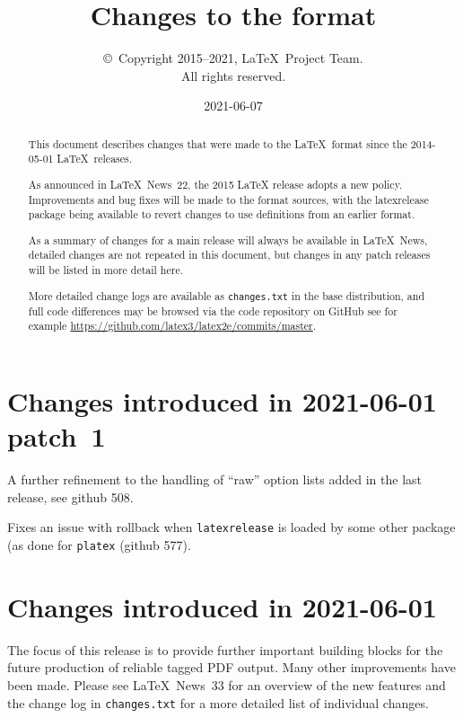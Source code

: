 \documentclass{ltxguide}
\title{Changes to the \LaTeXe{} format}
\author{\copyright~Copyright 2015--2021, \LaTeX\ Project Team.\\
   All rights reserved.}
\date{2021-06-07}
\newcommand\Lpack[1]{\mbox{\textsf{#1}}}
\newcommand\pkg[1]{\texttt{#1}}
\newcommand\ghissue[1]{github #1}
\newcommand\ltnewsissue[1]{\LaTeX\ News~#1}
\newcommand\ghissue[1]{%
    \href{https://github.com/latex3/latex2e/issues/#1}{github #1}}
\newcommand\ltnewsissue[1]{%
    \href{https://www.latex-project.org/news/latex2e-news/ltnews#1.pdf}{\LaTeX\ News~#1}}
\begin{document}
\maketitle

\begin{abstract}
This document describes changes that were made to the
\LaTeX\ format since the  2014-05-01 \LaTeX\ releases.


As announced in \ltnewsissue{22}, the 2015 \LaTeX{} release adopts a new
policy. Improvements and bug fixes will be made to the format sources,
with the \Lpack{latexrelease} package being available to revert
changes to use definitions from an earlier format.

As a summary of changes for a main release will always be available in
\LaTeX\ News, detailed changes are not repeated in this document,
but changes in any patch releases will be listed in more
detail here.

More detailed change logs are available as
\texttt{changes.txt} in the base distribution, and full code
  differences may be browsed via the code repository on GitHub
see for example
\url{https://github.com/latex3/latex2e/commits/master}.
\end{abstract}

\tableofcontents

\newpage


\section{Changes introduced in 2021-06-01 patch~1}

A further refinement to the handling of ``raw'' option lists added
in the last release, see \ghissue{508}.

Fixes an issue with rollback when \pkg{latexrelease} is loaded by some
other package (as done for \texttt{platex} (\ghissue{577}).



\section{Changes introduced in 2021-06-01}

The focus of this release is to provide further important building
blocks for the future production of reliable tagged PDF output.  Many
other improvements have been made. Please see \ltnewsissue{33} for an
overview of the new features and the change log in
\texttt{changes.txt} for a more detailed list of individual changes.
\end{document}
